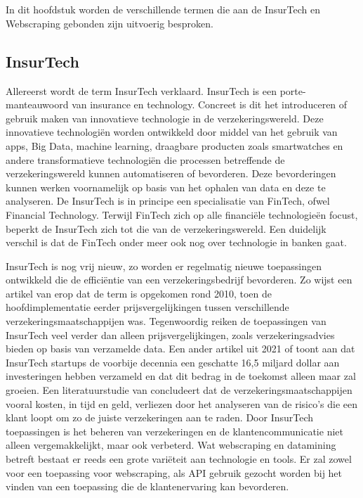 \chapter{}
\label{ch:stand-van-zaken}



In dit hoofdstuk worden de verschillende termen die aan de InsurTech en Webscraping gebonden zijn uitvoerig besproken.

\section{InsurTech}

Allereerst wordt de term InsurTech verklaard.
InsurTech is een porte-manteauwoord van insurance en technology.
Concreet is dit het introduceren of gebruik maken van innovatieve technologie in de verzekeringswereld.
Deze innovatieve technologiën worden ontwikkeld door middel van het gebruik van apps, Big Data, machine learning, draagbare producten zoals smartwatches en andere transformatieve technologiën die processen betreffende de verzekeringswereld kunnen automatiseren of bevorderen. Deze bevorderingen kunnen werken voornamelijk op basis van het ophalen van data en deze te analyseren.
De InsurTech is in principe een specialisatie van FinTech, ofwel Financial Technology.
Terwijl FinTech zich op alle financiële technologieën focust, beperkt de InsurTech zich tot die van de verzekeringswereld.
Een duidelijk verschil is dat de FinTech onder meer ook nog over technologie in banken gaat.

InsurTech is nog vrij nieuw, zo worden er regelmatig nieuwe toepassingen ontwikkeld die de efficiëntie van een verzekeringsbedrijf bevorderen. Zo wijst een artikel van \textcite{Institute2020} erop dat de term is opgekomen rond 2010, toen de hoofdimplementatie eerder prijsvergelijkingen tussen verschillende verzekeringsmaatschappijen was. Tegenwoordig reiken de toepassingen van InsurTech veel verder dan alleen prijsvergelijkingen, zoals verzekeringsadvies bieden op basis van verzamelde data. Een ander artikel uit 2021 of \textcite{InsuranceCommissioners2021} toont aan dat InsurTech startups de voorbije decennia een geschatte 16,5 miljard dollar aan investeringen hebben verzameld en dat dit bedrag in de toekomst alleen maar zal groeien. Een literatuurstudie van \textcite{inproceedings} concludeert dat de verzekeringsmaatschappijen vooral kosten, in tijd en geld, verliezen door het analyseren van de risico’s die een klant loopt om zo de juiste verzekeringen aan te raden. Door InsurTech toepassingen is het beheren van verzekeringen en de klantencommunicatie niet alleen vergemakkelijkt, maar ook verbeterd. Wat webscraping en datamining betreft bestaat er reeds een grote variëteit aan technologie en tools. Er zal zowel voor een toepassing voor webscraping, als API gebruik gezocht worden bij het vinden van een toepassing die de klantenervaring kan bevorderen.

